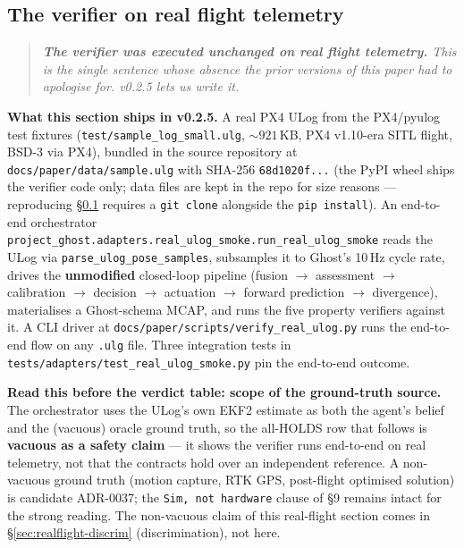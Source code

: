 \documentclass[acmsmall,nonacm=true,review=false]{acmart}
\theoremstyle{plain}
\begin{document}
\subsection{The verifier on real flight telemetry}
\label{sec:realflight}

\begin{quote}
\itshape
\textbf{The verifier was executed unchanged on real flight
telemetry.} This is the single sentence whose absence the prior
versions of this paper had to apologise for. v0.2.5 lets us write
it.
\end{quote}

\textbf{What this section ships in v0.2.5.} A real PX4 ULog from
the PX4/pyulog test fixtures
(\texttt{test/sample\_log\_small.ulg}, ${\sim}921$\,KB, PX4 v1.10-era
SITL flight, BSD-3 via PX4), bundled in the source repository at
\texttt{docs/paper/data/sample.ulg} with SHA-256
\texttt{68d1020f...} (the PyPI wheel ships the verifier code only;
data files are kept in the repo for size reasons --- reproducing
\S\ref{sec:realflight} requires a \texttt{git clone} alongside the
\texttt{pip install}). An end-to-end orchestrator
\texttt{project\_ghost.adapters.real\_ulog\_smoke.run\_real\_ulog\_smoke}
reads the ULog via \texttt{parse\_ulog\_pose\_samples}, subsamples
it to Ghost's 10\,Hz cycle rate, drives the \textbf{unmodified}
closed-loop pipeline (fusion $\to$ assessment $\to$ calibration
$\to$ decision $\to$ actuation $\to$ forward prediction $\to$
divergence), materialises a Ghost-schema MCAP, and runs the five
property verifiers against it. A CLI driver at
\texttt{docs/paper/scripts/verify\_real\_ulog.py} runs the
end-to-end flow on any \texttt{.ulg} file. Three integration tests
in \texttt{tests/adapters/test\_real\_ulog\_smoke.py} pin the
end-to-end outcome.

\textbf{Read this before the verdict table: scope of the
ground-truth source.} The orchestrator uses the ULog's own EKF2
estimate as both the agent's belief and the (vacuous) oracle
ground truth, so the all-HOLDS row that follows is \textbf{vacuous
as a safety claim} --- it shows the verifier runs end-to-end on
real telemetry, not that the contracts hold over an independent
reference. A non-vacuous ground truth (motion capture, RTK GPS,
post-flight optimised solution) is candidate ADR-0037; the
\texttt{Sim, not hardware} clause of \S9 remains intact for the
strong reading. The non-vacuous claim of this real-flight section
comes in \S\ref{sec:realflight-discrim} (discrimination), not
here.
\end{document}
